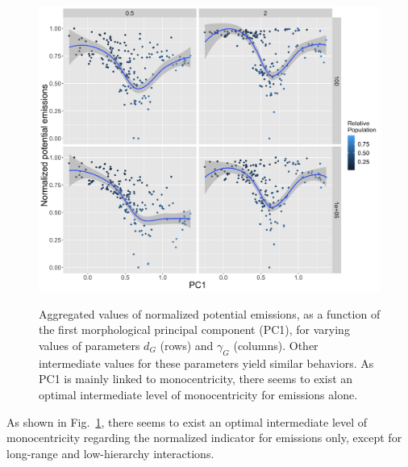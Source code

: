 \documentclass{jimis-en}
\begin{document}
\begin{figure}[ht] 
  {\includegraphics[width=\linewidth]{figures/aggreg_morpho_pc1-emissions_targeted.png}}
  \centering
  \caption{Aggregated values of normalized potential emissions, as a function of the first morphological principal component (PC1), for varying values of parameters $d_G$ (rows) and $\gamma_G$ (columns). Other intermediate values for these parameters yield similar behaviors. As PC1 is mainly linked to monocentricity, there seems to exist an optimal intermediate level of monocentricity for emissions alone.\label{fig:emissions-pc1}}
\end{figure}


As shown in Fig.~\ref{fig:emissions-pc1}, there seems to exist an optimal intermediate level of monocentricity regarding the normalized indicator for emissions only, except for long-range and low-hierarchy interactions.
\end{document}
